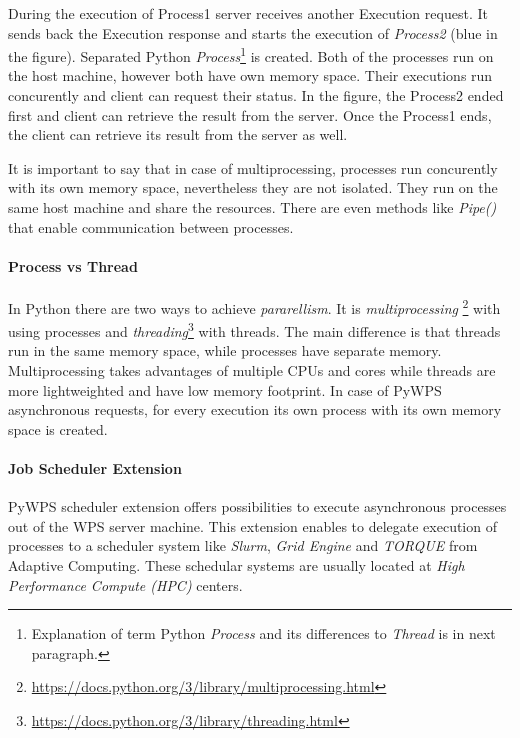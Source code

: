 During the execution of Process1 server receives another Execution request. It sends back the Execution response and starts the execution
of \textit{Process2} (blue in the figure). Separated Python \textit{Process}\footnote{Explanation of term Python \textit{Process} and its
differences to \textit{Thread} is in next paragraph.} is created. Both of the processes run on the host machine, however both have own memory
space. Their executions run concurently and client can request their status. In the figure, the Process2 ended first and client can retrieve
the result from the server. Once the Process1 ends, the client can retrieve its result from the server as well.

It is important to say that in case of multiprocessing, processes run concurently with its own memory space, nevertheless they are not isolated.
They run on the same host machine and share the resources. There are even methods like \textit{Pipe()} that enable communication between 
processes.

\paragraph{Process vs Thread} In Python there are two ways to achieve \textit{pararellism}. It is \textit{multiprocessing}
\footnote{\url{https://docs.python.org/3/library/multiprocessing.html}} with using processes and \textit{threading}\footnote{\url{https://docs.python.org/3/library/threading.html}} with threads. The main difference is that threads run in the same memory space, while processes
have separate memory. Multiprocessing takes advantages of multiple CPUs and cores while threads are more lightweighted and have low memory
footprint. In case of PyWPS asynchronous requests, for every execution its own process with its own memory space is created.

\paragraph{Job Scheduler Extension}
PyWPS scheduler extension offers possibilities to execute asynchronous processes out of the WPS server machine.
This extension enables to delegate execution of processes to a scheduler system like \textit{Slurm}, \textit{Grid Engine} 
and \textit{TORQUE} from Adaptive Computing. These schedular systems are usually located at \textit{High Performance Compute (HPC)}
centers.

